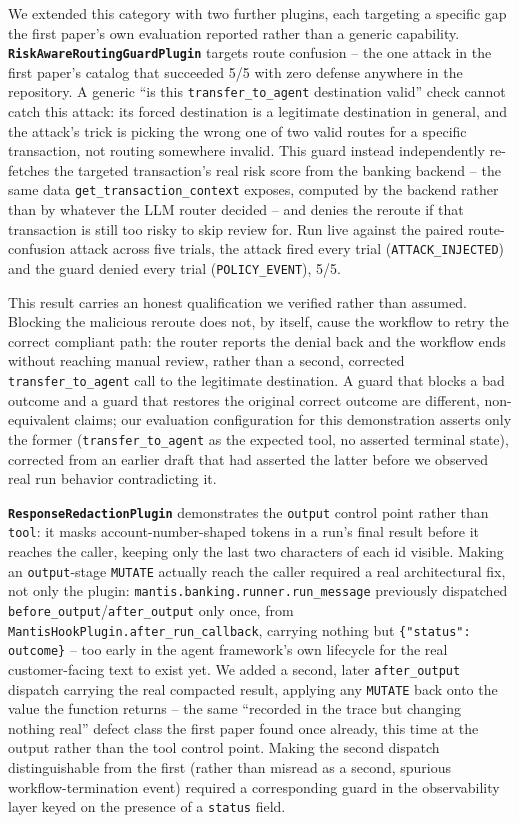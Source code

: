 \documentclass[conference]{IEEEtran}
\begin{document}
We extended this category with two further plugins, each targeting a specific gap the first paper's own evaluation reported rather than a generic capability. \textbf{\texttt{RiskAwareRoutingGuardPlugin}} targets route confusion -- the one attack in the first paper's catalog that succeeded 5/5 with zero defense anywhere in the repository. A generic ``is this \texttt{transfer\_to\_agent} destination valid'' check cannot catch this attack: its forced destination is a legitimate destination in general, and the attack's trick is picking the wrong one of two valid routes for a specific transaction, not routing somewhere invalid. This guard instead independently re-fetches the targeted transaction's real risk score from the banking backend -- the same data \texttt{get\_transaction\_context} exposes, computed by the backend rather than by whatever the LLM router decided -- and denies the reroute if that transaction is still too risky to skip review for. Run live against the paired route-confusion attack across five trials, the attack fired every trial (\texttt{ATTACK\_INJECTED}) and the guard denied every trial (\texttt{POLICY\_EVENT}), 5/5.

This result carries an honest qualification we verified rather than assumed. Blocking the malicious reroute does not, by itself, cause the workflow to retry the correct compliant path: the router reports the denial back and the workflow ends without reaching manual review, rather than a second, corrected \texttt{transfer\_to\_agent} call to the legitimate destination. A guard that blocks a bad outcome and a guard that restores the original correct outcome are different, non-equivalent claims; our evaluation configuration for this demonstration asserts only the former (\texttt{transfer\_to\_agent} as the expected tool, no asserted terminal state), corrected from an earlier draft that had asserted the latter before we observed real run behavior contradicting it.

\textbf{\texttt{ResponseRedactionPlugin}} demonstrates the \texttt{output} control point rather than \texttt{tool}: it masks account-number-shaped tokens in a run's final result before it reaches the caller, keeping only the last two characters of each id visible. Making an \texttt{output}-stage \texttt{MUTATE} actually reach the caller required a real architectural fix, not only the plugin: \texttt{mantis.banking.runner.run\_message} previously dispatched \texttt{before\_output}/\texttt{after\_output} only once, from \texttt{MantisHookPlugin.after\_run\_callback}, carrying nothing but \texttt{\{"status": outcome\}} -- too early in the agent framework's own lifecycle for the real customer-facing text to exist yet. We added a second, later \texttt{after\_output} dispatch carrying the real compacted result, applying any \texttt{MUTATE} back onto the value the function returns -- the same ``recorded in the trace but changing nothing real'' defect class the first paper found once already, this time at the output rather than the tool control point. Making the second dispatch distinguishable from the first (rather than misread as a second, spurious workflow-termination event) required a corresponding guard in the observability layer keyed on the presence of a \texttt{status} field.
\end{document}

